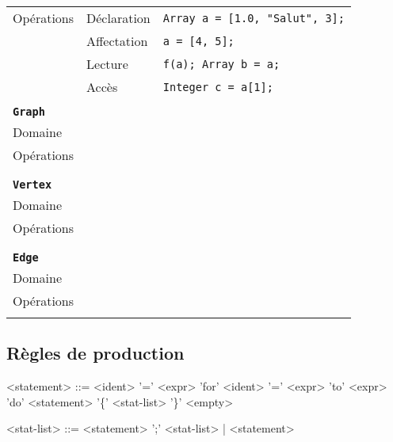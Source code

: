 \documentclass[french]{article}
\begin{document}
\begin{longtable}{lll}
					Opérations & Déclaration & \texttt{Array a = [1.0, "Salut", 3];}\\
							   & Affectation & \texttt{a = [4, 5];}\\ 
							   & Lecture & \texttt{f(a); Array b = a;}\\
							   & Accès & \texttt{Integer c = a[1];}\\
					\\
					\textbf{\texttt{Graph}}\\ \hline \hline
					Domaine & \multicolumn{2}{l}{}\\
					Opérations &  & \texttt{}\\
							   &  & \texttt{}\\ 
					\\
					\textbf{\texttt{Vertex}}\\ \hline \hline
					Domaine & \multicolumn{2}{l}{}\\
					Opérations &  & \texttt{}\\
							   &  & \texttt{}\\ 
					\\
					\textbf{\texttt{Edge}}\\ \hline \hline
					Domaine & \multicolumn{2}{l}{}\\
					Opérations &  & \texttt{}\\
							   &  & \texttt{}\\ 
				\end{longtable}
			
		\subsection{Règles de production} %
			\begin{grammar}
				<statement> ::= <ident> '=' <expr>
				\alt 'for' <ident> '=' <expr> 'to' <expr> 'do' <statement>
				\alt '\{' <stat-list> '\}'
				\alt <empty>
				
				<stat-list> ::= <statement> ';' <stat-list> | <statement>
			\end{grammar}
				
\end{document}
